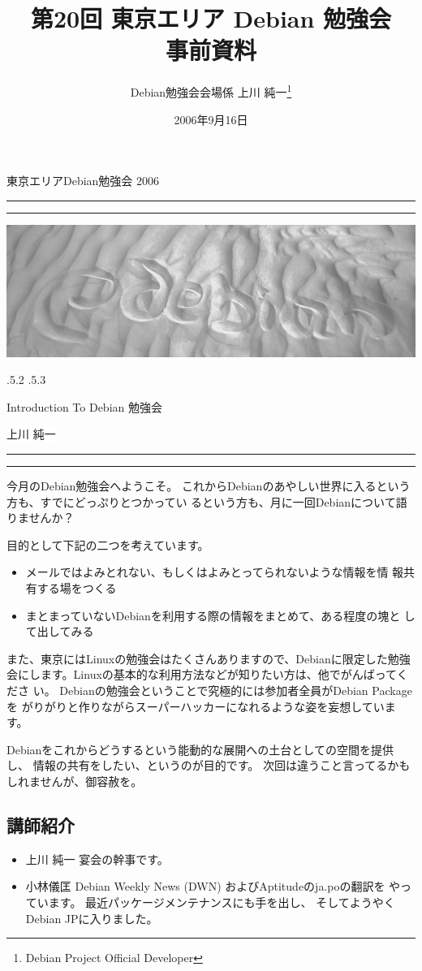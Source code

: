 \documentclass[mingoth,a4paper]{jsarticle}
\makeatletter
\renewcommand{\section}{\@startsection{section}{1}{\z@}%
    {\Cvs \@plus.5\Cdp \@minus.2\Cdp}%
    {.5\Cvs \@plus.3\Cdp}%
    {\normalfont\Huge\headfont\raggedright\centering}} %
\newcommand{\dancersection}[2]{%
\newpage
東京エリアDebian勉強会 2006
\hrule
\vspace{0.5mm}
\hrule
\hfill{}\includegraphics[width=16cm]{image2006-natsu/guruguru-sand-light.png}\\
\vspace{-5cm}
\begin{center}
\section{#1}
\end{center}
\hfill{}\colorbox{white}{#2}\hspace{3cm}\space\\
\vspace{1cm}
\hrule
\vspace{0.5mm}
\hrule
\vspace{1cm}
}
\makeatother
\begin{document}
\begin{titlepage}

\title{
 第20回 東京エリア Debian 勉強会\\事前資料}
\date{2006年9月16日}
\author{Debian勉強会会場係 上川 純一\thanks{Debian Project Official Developer}} 
\maketitle
\thispagestyle{empty}
\end{titlepage}

\newpage
\tableofcontents

\dancersection{Introduction To Debian 勉強会}{上川 純一}

今月のDebian勉強会へようこそ。
これからDebianのあやしい世界に入るという方も、すでにどっぷりとつかってい
るという方も、月に一回Debianについて語りませんか？

目的として下記の二つを考えています。

\begin{itemize}
 \item メールではよみとれない、もしくはよみとってられないような情報を情
       報共有する場をつくる
 \item まとまっていないDebianを利用する際の情報をまとめて、ある程度の塊と
       して出してみる
\end{itemize}

また、東京にはLinuxの勉強会はたくさんありますので、Debianに限定した勉強
会にします。Linuxの基本的な利用方法などが知りたい方は、他でがんばってくださ
い。
Debianの勉強会ということで究極的には参加者全員がDebian Packageを
がりがりと作りながらスーパーハッカーになれるような姿を妄想しています。

Debianをこれからどうするという能動的な展開への土台としての空間を提供し、
情報の共有をしたい、というのが目的です。
次回は違うこと言ってるかもしれませんが、御容赦を。

\subsection{講師紹介}

\begin{itemize}
 \item{上川 純一} 宴会の幹事です。
 \item{小林儀匡} Debian Weekly News (DWN) およびAptitudeのja.poの翻訳を
      やっています。
      最近パッケージメンテナンスにも手を出し、
      そしてようやくDebian JPに入りました。
\end{itemize}
\end{document}
